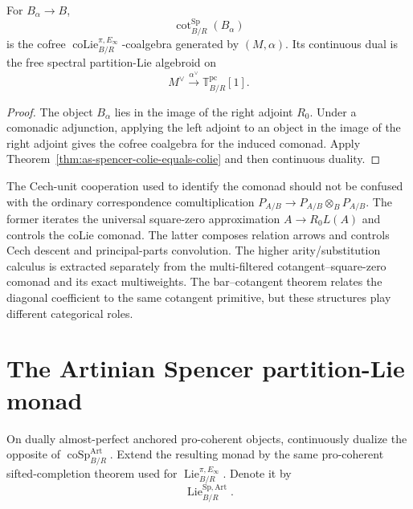 \begin{corollary}
\label{cor:as-square-zero-bar-colie}
For $B_\alpha\to B$,
\[
    \operatorname{cot}^{\mathrm{Sp}}_{B/R}(B_\alpha)
\]
is the cofree
$\operatorname{coLie}^{\pi,E_\infty}_{B/R}$-coalgebra generated by
$(M,\alpha)$.  Its continuous dual is the free spectral partition-Lie
algebroid on
\[
    M^\vee
    \xrightarrow{\alpha^\vee}
    \mathbb T_{B/R}^{\mathrm{pc}}[1].
\]
\end{corollary}

\begin{proof}
The object $B_\alpha$ lies in the image of the right adjoint $R_0$.  Under a
comonadic adjunction, applying the left adjoint to an object in the image of
the right adjoint gives the cofree coalgebra for the induced comonad.  Apply
Theorem~\ref{thm:as-spencer-colie-equals-colie} and then continuous duality.
\end{proof}

\begin{remark}
The Cech-unit cooperation used to identify the comonad should not be
confused with the ordinary correspondence comultiplication
$P_{A/B}\to P_{A/B}\otimes_BP_{A/B}$.  The former iterates the universal
square-zero approximation $A\to R_0L(A)$ and controls the coLie comonad.  The
latter composes relation arrows and controls Cech descent and principal-parts
convolution.  The higher arity/substitution calculus is extracted separately
from the multi-filtered cotangent--square-zero comonad and its exact
multiweights.  The bar--cotangent theorem relates the diagonal coefficient to
the same cotangent primitive, but these structures play different categorical
roles.
\end{remark}

\section{The Artinian Spencer partition-Lie monad}
\label{sec:as-higher-operations}

\begin{definition}
\label{def:as-spencer-partition-monad}
On dually almost-perfect anchored pro-coherent objects, continuously dualize
the opposite of
$\operatorname{coSp}^{\mathrm{Art}}_{B/R}$.  Extend the resulting monad by
the same pro-coherent sifted-completion theorem used for
$\operatorname{Lie}^{\pi,E_\infty}_{B/R}$.  Denote it by
\[
\boxed{
    \operatorname{Lie}^{\mathrm{Sp,Art}}_{B/R}.
}
\]
\end{definition}

